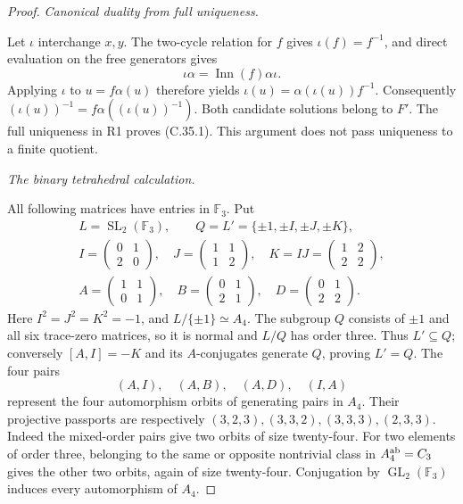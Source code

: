 \begin{proof}
\emph{Canonical duality from full uniqueness.}\par
Let \(\iota\) interchange \(x,y\). The two-cycle relation for
\(f\) gives \(\iota(f)=f^{-1}\), and direct evaluation on the
free generators gives
\[
                   \iota\alpha=\operatorname{Inn}(f)\alpha\iota.
\]
Applying \(\iota\) to \(u=f\alpha(u)\) therefore yields
\(\iota(u)=\alpha(\iota(u))f^{-1}\). Consequently
\((\iota(u))^{-1}=f\alpha((\iota(u))^{-1})\).
Both candidate solutions belong to \(F'\). The full uniqueness in
R1 proves (C.35.1). This argument does not pass uniqueness to a
finite quotient.

\emph{The binary tetrahedral calculation.}\par
All following matrices have entries in \(\mathbb F_3\). Put
\[
\begin{gathered}
 L=\operatorname{SL}_2(\mathbb F_3),\qquad
 Q=L'=\{\pm1,\pm I,\pm J,\pm K\},\\
 I=\begin{pmatrix}0&1\\2&0\end{pmatrix},\quad
 J=\begin{pmatrix}1&1\\1&2\end{pmatrix},\quad
 K=IJ=\begin{pmatrix}1&2\\2&2\end{pmatrix},\\
 A=\begin{pmatrix}1&1\\0&1\end{pmatrix},\quad
 B=\begin{pmatrix}0&1\\2&1\end{pmatrix},\quad
 D=\begin{pmatrix}0&1\\2&2\end{pmatrix}.
\end{gathered}
 \tag{C.35.3}
\]
Here \(I^2=J^2=K^2=-1\), and \(L/\{\pm1\}\simeq A_4\).
The subgroup \(Q\) consists of \(\pm1\) and all six trace-zero
matrices, so it is normal and \(L/Q\) has order three. Thus
\(L'\subseteq Q\); conversely \([A,I]=-K\) and its
\(A\)-conjugates generate \(Q\), proving \(L'=Q\).
The four pairs
\[
              (A,I),\quad(A,B),\quad(A,D),\quad(I,A)
 \tag{C.35.4}
\]
represent the four automorphism orbits of generating pairs in
\(A_4\). Their projective passports are respectively
\((3,2,3),(3,3,2),(3,3,3),(2,3,3)\).
Indeed the mixed-order pairs give two orbits of size twenty-four.
For two elements of order three, belonging to the same or opposite
nontrivial class in \(A_4^{\rm ab}=C_3\) gives the other two
orbits, again of size twenty-four. Conjugation by
\(\operatorname{GL}_2(\mathbb F_3)\) induces every automorphism
of \(A_4\).


\end{proof}
